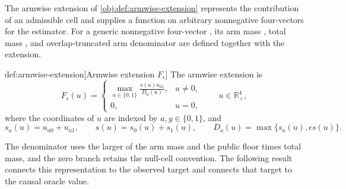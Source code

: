 \documentclass[11pt]{article}
\begin{document}
The armwise extension  of \cref{obj:def:armwise-extension} represents the contribution of an admissible cell and supplies a function on arbitrary nonnegative four-vectors for the estimator. For a generic nonnegative four-vector , its arm mass , total mass , and overlap-truncated arm denominator  are defined together with the extension.

\begin{definitionv}{def:armwise-extension}[Armwise extension \(F_\epsilon\)]
The armwise extension is
\[
F_\epsilon(u)
=
\begin{cases}
\displaystyle
\max_{a\in\{0,1\}}\frac{s(u)u_{a1}}{D_a(u)},&u\ne0,\\[6pt]
0,&u=0,
\end{cases}
\qquad u\in\mathbb R_+^4,
\]
where the coordinates of \(u\) are indexed by \(a,y\in\{0,1\}\), and
\[
s_a(u)=u_{a0}+u_{a1},
\qquad
s(u)=s_0(u)+s_1(u),
\qquad
D_a(u)=\max\{s_a(u),\epsilon s(u)\}.
\]
\end{definitionv}

The denominator uses the larger of the arm mass and the public floor times total mass, and the zero branch retains the null-cell convention. The following result connects this representation to the observed target and connects that target to the causal oracle value.
\end{document}
